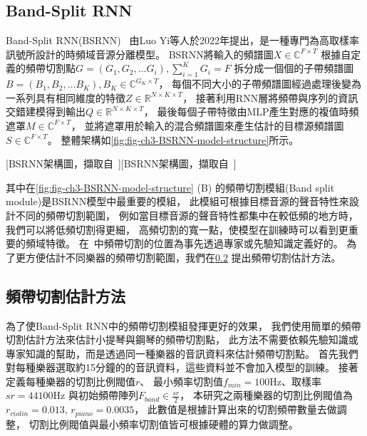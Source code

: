 \documentclass[class=NCU_thesis, crop=false]{standalone}
\begin{document}
\subsection{Band-Split RNN} \label{ch3-subst-band-split-RNN}
Band-Split RNN(BSRNN)~\cite{Luo_Yi2022MusicSourceSeparation}
由Luo Yi等人於2022年提出，是一種專門為高取樣率訊號所設計的時頻域音源分離模型。
BSRNN將輸入的頻譜圖$X\in \mathbb{C} ^{F\times T}$
根據自定義的頻帶切割點$G = (G_1, G_2, \dots G_i), \sum_{i = 1}^{K} G_i = F $
拆分成一個個的子帶頻譜圖$B = (B_1, B_2, \dots B_K), B_K \in \mathbb{C}^{G_K\times T}$，
每個不同大小的子帶頻譜圖經過處理後變為一系列具有相同維度的特徵$Z\in \mathbb{R}^{N\times K\times T}$，
接著利用RNN層將頻帶與序列的資訊交錯建模得到輸出$Q\in \mathbb{R}^{N\times K\times T}$，
最後每個子帶特徵由MLP產生對應的複值時頻遮罩$M\in \mathbb{C}^{F\times T}$，
並將遮罩用於輸入的混合頻譜圖來產生估計的目標源頻譜圖$S\in \mathbb{C}^{F\times T}$。
整體架構如\cref{fig:fig-ch3-BSRNN-model-structure}所示。

[BSRNN架構圖，擷取自~\cite{Luo_Yi2022MusicSourceSeparation}][BSRNN架構圖，擷取自~\cite{Luo_Yi2022MusicSourceSeparation}]

其中在\cref{fig:fig-ch3-BSRNN-model-structure} (B) 
的頻帶切割模組(Band split module)是BSRNN模型中最重要的模組，
此模組可根據目標音源的聲音特性來設計不同的頻帶切割範圍，
例如當目標音源的聲音特性都集中在較低頻的地方時，我們可以將低頻切割得更細，
高頻切割的寬一點，使模型在訓練時可以看到更重要的頻域特徵。
在~\cite{Luo_Yi2022MusicSourceSeparation}中頻帶切割的位置為事先透過專家或先驗知識定義好的。
為了更方便估計不同樂器的頻帶切割範圍，我們在\cref{ch3-subst-estimate-band-split-point}
提出頻帶切割估計方法。

\subsection{頻帶切割估計方法} \label{ch3-subst-estimate-band-split-point}
為了使Band-Split RNN中的頻帶切割模組發揮更好的效果，
我們使用簡單的頻帶切割估計方法來估計小提琴與鋼琴的頻帶切割點，
此方法不需要依賴先驗知識或專家知識的幫助，而是透過同一種樂器的音訊資料來估計頻帶切割點。
首先我們對每種樂器選取約15分鐘的的音訊資料，這些資料並不會加入模型的訓練。
接著定義每種樂器的切割比例閥值$r$、
最小頻率切割值$f_{min}=100$Hz、取樣率$sr = 44100$Hz
與初始頻帶陣列$F_{band} \in \frac{sr}{2} $，
本研究之兩種樂器的切割比例閥值為$r_{violin}=0.013$, $r_{piano}=0.0035$，
此數值是根據計算出來的切割頻帶數量去做調整，
切割比例閥值與最小頻率切割值皆可根據硬體的算力做調整。
\end{document}
